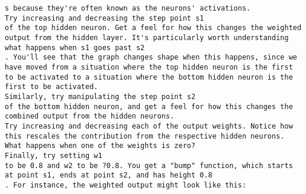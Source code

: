 \begin{lstlisting}
s because they're often known as the neurons' activations.
Try increasing and decreasing the step point s1
of the top hidden neuron. Get a feel for how this changes the weighted output from the hidden layer. It's particularly worth understanding what happens when s1 goes past s2
. You'll see that the graph changes shape when this happens, since we have moved from a situation where the top hidden neuron is the first to be activated to a situation where the bottom hidden neuron is the first to be activated.
Similarly, try manipulating the step point s2
of the bottom hidden neuron, and get a feel for how this changes the combined output from the hidden neurons.
Try increasing and decreasing each of the output weights. Notice how this rescales the contribution from the respective hidden neurons. What happens when one of the weights is zero?
Finally, try setting w1
to be 0.8 and w2 to be ?0.8. You get a "bump" function, which starts at point s1, ends at point s2, and has height 0.8
. For instance, the weighted output might look like this:


\end{lstlisting}
